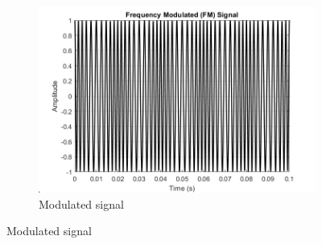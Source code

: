 \documentclass[a4paper,12pt]{article}
\begin{document}
\begin{figure}[H]
		\begin{subfigure}[t]{0.49\textwidth}
			\centering
			\includegraphics[width=1\linewidth]{Images/3.1}
			\caption{ Modulated signal }
		\end{subfigure}
	
	\end{figure}
	
	
\end{document}

